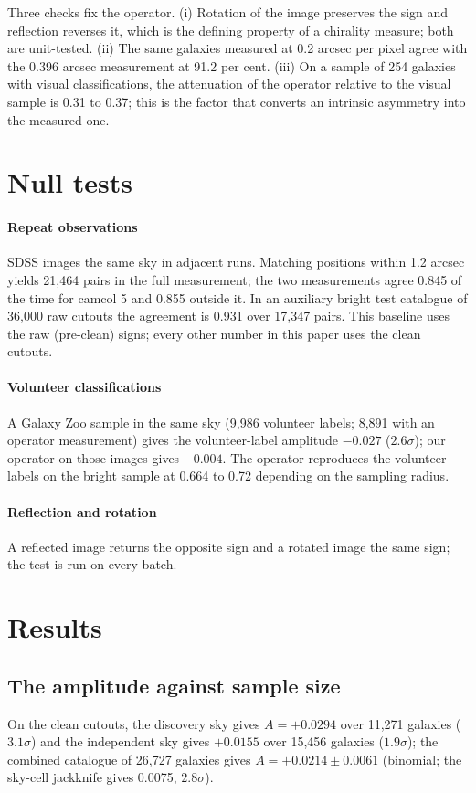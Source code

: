 \documentclass[preprint,12pt,authoryear]{elsarticle}
\begin{document}
Three checks fix the operator. (i) Rotation of the image preserves the sign and reflection reverses
it, which is the defining property of a chirality measure; both are unit-tested. (ii) The same
galaxies measured at 0.2 arcsec per pixel agree with the 0.396 arcsec measurement at 91.2 per cent.
(iii) On a sample of 254 galaxies with visual classifications, the attenuation of the operator
relative to the visual sample is 0.31 to 0.37; this is the factor that converts an intrinsic
asymmetry into the measured one.

\section{Null tests}

\paragraph{Repeat observations} SDSS images the same sky in adjacent runs. Matching positions
within 1.2 arcsec yields 21,464 pairs in the full measurement; the two measurements agree 0.845 of
the time for camcol 5 and 0.855 outside it. In an auxiliary bright test catalogue of 36,000 raw cutouts the agreement is 0.931 over
17,347 pairs. This baseline uses the raw (pre-clean) signs; every other number in this paper uses
the clean cutouts.

\paragraph{Volunteer classifications} A Galaxy Zoo sample in the same sky \citep{lintott2008, masters2021} (9,986 volunteer labels; 8,891 with an operator measurement) gives the volunteer-label amplitude $-0.027$ ($2.6\sigma$); our operator on those images gives $-0.004$. The
operator reproduces the volunteer labels on the bright sample at 0.664 to 0.72 depending on the
sampling radius.

\paragraph{Reflection and rotation} A reflected image returns the opposite sign and a rotated
image the same sign; the test is run on every batch.

\section{Results}

\subsection{The amplitude against sample size}
On the clean cutouts, the discovery sky gives $A = +0.0294$ over 11,271 galaxies ($3.1\sigma$) and
the independent sky gives $+0.0155$ over 15,456 galaxies ($1.9\sigma$); the combined catalogue of
26,727 galaxies gives $A = +0.0214 \pm 0.0061$ (binomial; the sky-cell jackknife gives 0.0075,
$2.8\sigma$).
\end{document}

